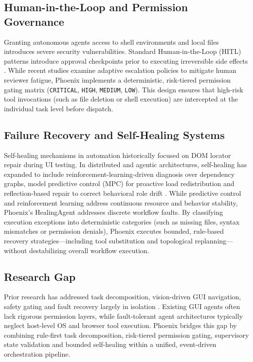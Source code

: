\documentclass[conference]{IEEEtran}
\begin{document}
\subsection{Human-in-the-Loop and Permission Governance}
Granting autonomous agents access to shell environments and local files introduces severe security vulnerabilities. Standard Human-in-the-Loop (HITL) patterns introduce approval checkpoints prior to executing irreversible side effects \cite{bajoria2026}. While recent studies examine adaptive escalation policies to mitigate human reviewer fatigue, Phoenix implements a deterministic, risk-tiered permission gating matrix (\texttt{CRITICAL}, \texttt{HIGH}, \texttt{MEDIUM}, \texttt{LOW}). This design ensures that high-risk tool invocations (such as file deletion or shell execution) are intercepted at the individual task level before dispatch.

\subsection{Failure Recovery and Self-Healing Systems}
Self-healing mechanisms in automation historically focused on DOM locator repair during UI testing. In distributed and agentic architectures, self-healing has expanded to include reinforcement-learning-driven diagnosis over dependency graphs, model predictive control (MPC) for proactive load redistribution and reflection-based repair to correct behavioral role drift \cite{ju2025, wang2026, patel2026isiber}. While predictive control and reinforcement learning address continuous resource and behavior stability, Phoenix's HealingAgent addresses discrete workflow faults. By classifying execution exceptions into deterministic categories (such as missing files, syntax mismatches or permission denials), Phoenix executes bounded, rule-based recovery strategies—including tool substitution and topological replanning—without destabilizing overall workflow execution.

\subsection{Research Gap}
Prior research has addressed task decomposition, vision-driven GUI navigation, safety gating and fault recovery largely in isolation \cite{jeong2026, guo2026, bara2026, nguyen2025, bajoria2026}. Existing GUI agents often lack rigorous permission layers, while fault-tolerant agent architectures typically neglect host-level OS and browser tool execution. Phoenix bridges this gap by combining rule-first task decomposition, risk-tiered permission gating, supervisory state validation and bounded self-healing within a unified, event-driven orchestration pipeline.
\end{document}
